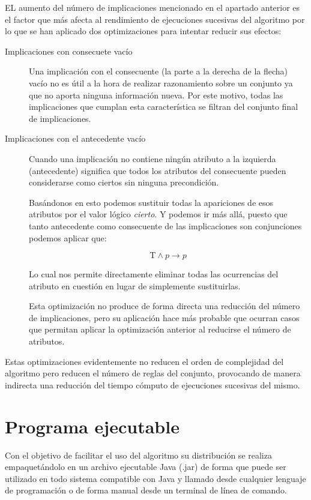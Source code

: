 	EL aumento del número de implicaciones mencionado en el apartado anterior es el factor que más afecta al rendimiento de ejecuciones sucesivas del algoritmo por lo que se han aplicado dos optimizaciones para intentar reducir sus efectos:

	\begin{description}
		\item[Implicaciones con consecuete vacío] 
			Una implicación con el 	consecuente (la parte a la derecha de la flecha) vacío no es útil a la hora de realizar razonamiento sobre un conjunto ya que no aporta ninguna información nueva. Por este motivo, todas las implicaciones que cumplan esta característica se filtran del conjunto final de implicaciones.
		\item[Implicaciones con el antecedente vacío] 
			Cuando una implicación no contiene ningún atributo a la izquierda (antecedente) significa que todos los atributos del consecuente pueden considerarse como ciertos sin ninguna precondición. 
	
			Basándonos en esto podemos sustituir todas la apariciones de esos atributos por el valor lógico \textit{cierto}. Y podemos ir más allá, puesto que tanto antecedente como consecuente de las implicaciones son conjunciones podemos aplicar que:
			
			\[
				\text{T} \wedge p \rightarrow p
			\]		
			
			Lo cual nos permite directamente eliminar todas las ocurrencias del atributo en cuestión en lugar de simplemente sustituirlas. 
			
			Esta optimización no produce de forma directa una reducción del número de implicaciones, pero su aplicación hace más probable que ocurran casos que permitan aplicar la optimización anterior al reducirse el número de atributos.	
	\end{description}


	Estas optimizaciones evidentemente no reducen el orden de complejidad del algoritmo pero reducen el número de reglas del conjunto, provocando de manera indirecta una reducción del tiempo cómputo de ejecuciones sucesivas del mismo.
	
\section*{Programa ejecutable}

	Con el objetivo de facilitar el uso del algoritmo su distribución se realiza empaquetándolo en un archivo ejecutable Java (.jar) de forma que puede ser utilizado en todo sistema compatible con Java y llamado desde cualquier lenguaje de programación o de forma manual desde un terminal de línea de comando. 	
	
